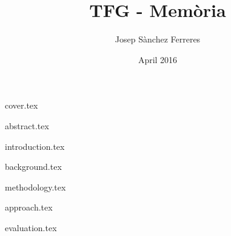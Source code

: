 \documentclass[10pt,a4paper]{report}
\title{TFG - Memòria}
\author{Josep Sànchez Ferreres}
\date{April 2016}
\begin{document}
\cite{gurobi}

\maketitle

\tableofcontents

{cover.tex}

{abstract.tex}

{introduction.tex}

{background.tex}

{methodology.tex}

{approach.tex}

{evaluation.tex}

\printbibliography[heading=bibliography]{}
\end{document}
